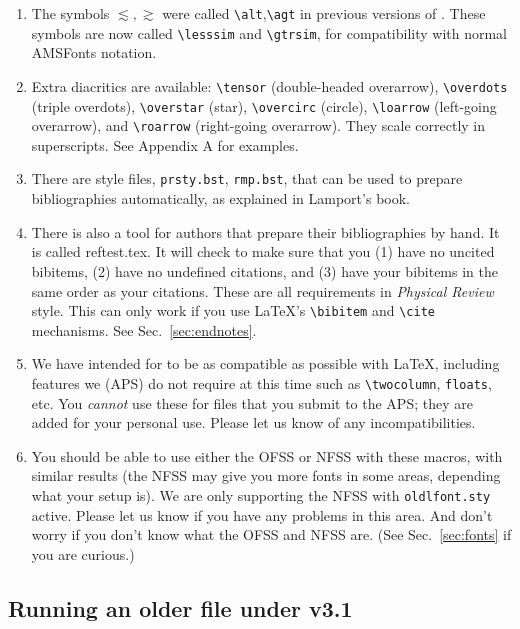 \begin{enumerate}
\item The symbols $\lesssim,\gtrsim$ were called \verb+\alt+,\verb+\agt+ in
previous versions of \REVTeX{}. These symbols are now called
\verb+\lesssim+ and \verb+\gtrsim+, for compatibility with normal AMSFonts
notation.

\item Extra diacritics are available: \verb+\tensor+ (double-headed
overarrow), \verb+\overdots+ (triple overdots), \verb+\overstar+ (star),
\verb+\overcirc+ (circle), \verb+\loarrow+ (left-going overarrow), and
\verb+\roarrow+ (right-going overarrow). They scale correctly in
superscripts. See Appendix A for examples.

\item There are \BibTeX{} style files, \verb+prsty.bst+,
\verb+rmp.bst+, that can be used
to prepare bibliographies automatically, as explained in Lamport's book.

\item There is also a tool for authors that prepare their bibliographies by
hand. It is called reftest.tex. It will check to make sure that you (1)
have no uncited bibitems, (2) have no undefined citations, and (3) have
your bibitems in the same order as your citations. These are all
requirements in {\it Physical Review\/} style. This can only work if you
use \LaTeX{}'s \verb+\bibitem+ and \verb+\cite+ mechanisms. See Sec.\
\ref{sec:endnotes}.

\item We have intended for \REVTeX{} to be as compatible as
possible with \LaTeX{}, including features we (APS) do not require at this
time such as \verb+\twocolumn+, \verb+floats+, etc. You {\em
cannot\/} use these for files that you submit to the APS; they are added for
your personal use. Please let us know of any incompatibilities.

\item You should be able to use either the OFSS or NFSS with these macros,
with similar results (the NFSS may give you more fonts in some areas,
depending what your setup is). We are only supporting the NFSS
with \verb+oldlfont.sty+ active. Please let us know if you have any
problems in this area. And don't worry if you don't know what the OFSS and
NFSS are. (See Sec.\ \ref{sec:fonts} if you are curious.) 
\end{enumerate}

\subsection{Running an older \REVTeX{} file under \REVTeX{} v3.1}

